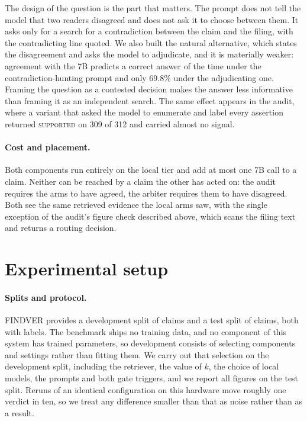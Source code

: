 \documentclass{article}
\begin{document}
The design of the question is the part that matters. The prompt does not tell the model that
two readers disagreed and does not ask it to choose between them. It asks only for a search
for a contradiction between the claim and the filing, with the contradicting line quoted. We
also built the natural alternative, which states the disagreement and asks the model to
adjudicate, and it is materially weaker: agreement with the 7B predicts a correct answer
\arbSidedSevenBCorrect{} of the time under the contradiction-hunting prompt and only 69.8\%
under the adjudicating one. Framing the question as a contested decision makes the answer
less informative than framing it as an independent search. The same effect appears in the
audit, where a variant that asked the model to enumerate and label every assertion returned
\textsc{supported} on 309 of 312 and carried almost no signal.

\paragraph{Cost and placement.}
Both components run entirely on the local tier and add at most one 7B call to a claim.
Neither can be reached by a claim the other has acted on: the audit requires the arms to
have agreed, the arbiter requires them to have disagreed. Both see the same retrieved
evidence the local arms saw, with the single exception of the audit's figure check described
above, which scans the filing text and returns a routing decision.

\section{Experimental setup}
\label{sec:setup}

\paragraph{Splits and protocol.}
FINDVER provides a development split of \nDev{} claims and a test split of \nTest{} claims,
both with labels. The benchmark ships no training data, and no component of this system has
trained parameters, so development consists of selecting components and settings rather than
fitting them. We carry out that selection on the development split, including the retriever,
the value of $k$, the choice of local models, the prompts and both gate triggers, and we
report all figures on the test split. Reruns of an identical configuration on this hardware
move roughly one verdict in ten, so we treat any difference smaller than that as noise rather
than as a result.
\end{document}
